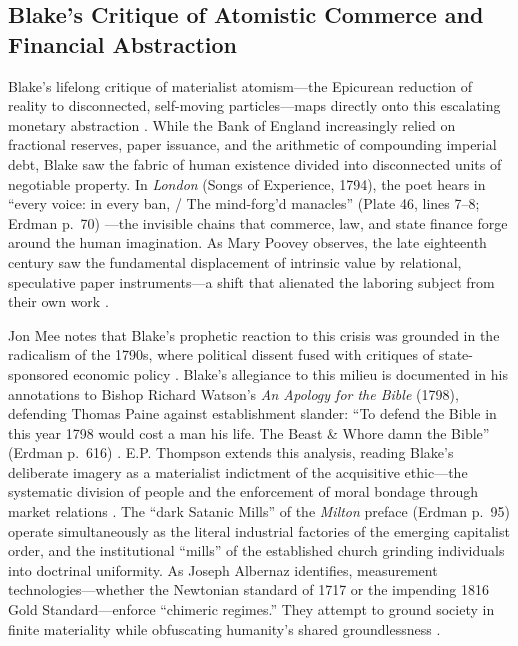 \documentclass[
]{article}
\begin{document}
\subsection{Blake's Critique of Atomistic Commerce and Financial
Abstraction}\label{blakes-critique-of-atomistic-commerce-and-financial-abstraction}

Blake's lifelong critique of materialist atomism---the Epicurean
reduction of reality to disconnected, self-moving particles---maps
directly onto this escalating monetary abstraction
\citep{schouten2020epicurean}. While the Bank of England increasingly
relied on fractional reserves, paper issuance, and the arithmetic of
compounding imperial debt, Blake saw the fabric of human existence
divided into disconnected units of negotiable property. In \emph{London}
(Songs of Experience, 1794), the poet hears in ``every voice: in every
ban, / The mind-forg'd manacles'' (Plate 46, lines 7--8; Erdman p.~70)
\citep{erdman1988complete}---the invisible chains that commerce, law,
and state finance forge around the human imagination. As Mary Poovey
observes, the late eighteenth century saw the fundamental displacement
of intrinsic value by relational, speculative paper instruments---a
shift that alienated the laboring subject from their own work
\citep{poovey2008genres}.

Jon Mee notes that Blake's prophetic reaction to this crisis was
grounded in the radicalism of the 1790s, where political dissent fused
with critiques of state-sponsored economic policy
\citep{mee1992dangerous}. Blake's allegiance to this milieu is
documented in his annotations to Bishop Richard Watson's \emph{An
Apology for the Bible} (1798), defending Thomas Paine against
establishment slander: ``To defend the Bible in this year 1798 would
cost a man his life. The Beast \& Whore damn the Bible'' (Erdman p.~616)
\citep{erdman1988complete}. E.P. Thompson extends this analysis, reading
Blake's deliberate imagery as a materialist indictment of the
acquisitive ethic---the systematic division of people and the
enforcement of moral bondage through market relations
\citep{thompson1993witness}. The ``dark Satanic Mills'' of the
\emph{Milton} preface (Erdman p.~95) operate simultaneously as the
literal industrial factories of the emerging capitalist order, and the
institutional ``mills'' of the established church grinding individuals
into doctrinal uniformity. As Joseph Albernaz identifies, measurement
technologies---whether the Newtonian standard of 1717 or the impending
1816 Gold Standard---enforce ``chimeric regimes.'' They attempt to
ground society in finite materiality while obfuscating humanity's shared
groundlessness \citep{albernaz2024common}.
\end{document}
